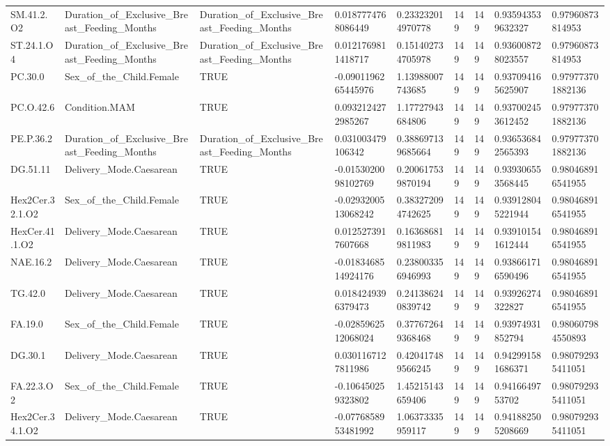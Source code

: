 \begin{longtable}{lllllllll}
SM.41.2.O2 & Duration\_of\_Exclusive\_Breast\_Feeding\_Months & Duration\_of\_Exclusive\_Breast\_Feeding\_Months & 0.0187774768086449 & 0.233232014970778 & 149 & 149 & 0.935943539632327 & 0.97960873814953 \\
ST.24.1.O4 & Duration\_of\_Exclusive\_Breast\_Feeding\_Months & Duration\_of\_Exclusive\_Breast\_Feeding\_Months & 0.0121769811418717 & 0.151402734705978 & 149 & 149 & 0.936008728023557 & 0.97960873814953 \\
PC.30.0 & Sex\_of\_the\_Child.Female & TRUE & -0.0901196265445976 & 1.13988007743685 & 149 & 149 & 0.937094165625907 & 0.979773701882136 \\
PC.O.42.6 & Condition.MAM & TRUE & 0.0932124272985267 & 1.17727943684806 & 149 & 149 & 0.937002453612452 & 0.979773701882136 \\
PE.P.36.2 & Duration\_of\_Exclusive\_Breast\_Feeding\_Months & Duration\_of\_Exclusive\_Breast\_Feeding\_Months & 0.031003479106342 & 0.388697139685664 & 149 & 149 & 0.936536842565393 & 0.979773701882136 \\
DG.51.11 & Delivery\_Mode.Caesarean & TRUE & -0.0153020098102769 & 0.200617539870194 & 149 & 149 & 0.939306553568445 & 0.980468916541955 \\
Hex2Cer.32.1.O2 & Sex\_of\_the\_Child.Female & TRUE & -0.0293200513068242 & 0.383272094742625 & 149 & 149 & 0.939128045221944 & 0.980468916541955 \\
HexCer.41.1.O2 & Delivery\_Mode.Caesarean & TRUE & 0.0125273917607668 & 0.163686819811983 & 149 & 149 & 0.939101541612444 & 0.980468916541955 \\
NAE.16.2 & Delivery\_Mode.Caesarean & TRUE & -0.0183468514924176 & 0.238003356946993 & 149 & 149 & 0.938661716590496 & 0.980468916541955 \\
TG.42.0 & Delivery\_Mode.Caesarean & TRUE & 0.0184249396379473 & 0.241386240839742 & 149 & 149 & 0.93926274322827 & 0.980468916541955 \\
FA.19.0 & Sex\_of\_the\_Child.Female & TRUE & -0.0285962512068024 & 0.377672649368468 & 149 & 149 & 0.93974931852794 & 0.980607984550893 \\
DG.30.1 & Delivery\_Mode.Caesarean & TRUE & 0.0301167127811986 & 0.420417489566245 & 149 & 149 & 0.942991581686371 & 0.980792935411051 \\
FA.22.3.O2 & Sex\_of\_the\_Child.Female & TRUE & -0.106450259323802 & 1.45215143659406 & 149 & 149 & 0.9416649753702 & 0.980792935411051 \\
Hex2Cer.34.1.O2 & Delivery\_Mode.Caesarean & TRUE & -0.0776858953481992 & 1.06373335959117 & 149 & 149 & 0.941882505208669 & 0.980792935411051 \\

\end{longtable}
